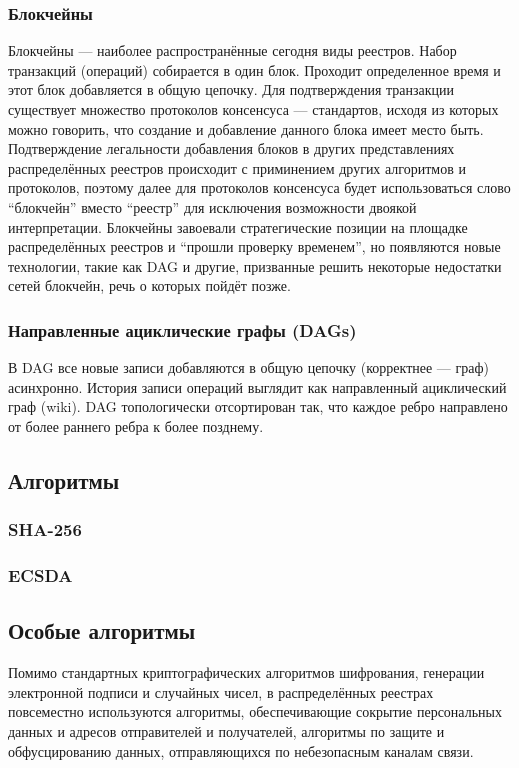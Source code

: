\subsubsection{Блокчейны}\label{struct_block}
Блокчейны --- наиболее распространённые сегодня виды реестров. Набор транзакций
(операций) собирается в один блок. Проходит определенное время и этот блок
добавляется в общую цепочку. Для подтверждения транзакции существует множество
протоколов консенсуса --- стандартов, исходя из которых можно говорить, что
создание и добавление данного блока имеет место быть. Подтверждение легальности
добавления блоков в других представлениях распределённых реестров происходит с
приминением других алгоритмов и протоколов, поэтому далее для протоколов
консенсуса будет использоваться слово ``блокчейн'' вместо ``реестр'' для
исключения возможности двоякой интерпретации. Блокчейны завоевали
стратегические позиции на площадке распределённых реестров и ``прошли проверку
временем'', но появляются новые технологии, такие как DAG и другие, призванные
решить некоторые недостатки сетей блокчейн, речь о которых пойдёт позже.

\subsubsection{Направленные ациклические графы (DAGs)}\label{struct_dags}
В DAG все новые записи добавляются в общую цепочку (корректнее --- граф)
асинхронно. История записи операций выглядит как направленный ациклический граф
(wiki). DAG топологически отсортирован так, что каждое ребро направлено от
более раннего ребра к более позднему.


\subsection{Алгоритмы}
\subsubsection{SHA-256}
\subsubsection{ECSDA}


\subsection{Особые алгоритмы}
Помимо стандартных криптографических алгоритмов шифрования, генерации
электронной подписи и случайных чисел, в распределённых реестрах повсеместно
используются алгоритмы, обеспечивающие сокрытие персональных данных и адресов
отправителей и получателей, алгоритмы по защите и обфусцированию данных,
отправляющихся по небезопасным каналам связи.
